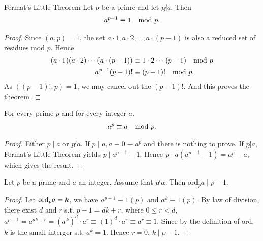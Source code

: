 
\begin{mysubsection}{}
    \begin{theorem}[thm:]{Fermat's Little Theorem}
        Let $p$ be a prime and let $p\not|a$. Then
        \begin{alignat*}{1}
            a^{p-1}\equiv 1\quad \textnormal{mod }p.
        \end{alignat*}
    \end{theorem}

    \begin{proof}
        Since $(a,p)=1$, the set $a\cdot 1,a\cdot 2,\dots,a\cdot (p-1)$ is also a reduced set of residues mod $p$. Hence
        \begin{alignat*}{1}
            (a\cdot 1)(a\cdot 2)\cdots(a\cdot (p-1))&\equiv 1\cdot 2\cdots(p-1)\quad \textnormal{mod }p\\
            a^{p-1}(p-1)!&\equiv (p-1)!\quad \textnormal{mod }p.
        \end{alignat*}
        As $((p-1)!,p)=1$, we may cancel out the $(p-1)!$. And this proves the theorem.
    \end{proof}

    \mynewpage

    \begin{corollary}[crl:]{}
        For every prime $p$ and for every integer $a$,
        \begin{alignat*}{1}
            a^p\equiv a \quad \textnormal{mod }p.
        \end{alignat*}
    \end{corollary}

    \begin{proof}
        Either $p\mid a$ or $p\not| a$. If $p\mid a, a\equiv 0\equiv a^p$ and there is nothing to prove. If $p\not| a$, Fermat's Little Theorem yields $p\mid a^{p-1}-1$. Hence $p\mid a(a^{p-1}-1)=a^{p}-a$, which gives the result.
    \end{proof}

    \begin{corollary}[crl:]{}
        Let $p$ be a prime and $a$ an integer. Assume that $p\not|a$. Then ord$_pa\mid p-1$.
    \end{corollary}

    \begin{proof}
        Let $\textnormal{ord}_pa=k$, we have $a^{p-1}\equiv 1(p)$ and $a^k\equiv 1(p)$. By law of division, there exist $d$ and $r$ s.t. $p-1=dk+r$, where $0\leq r<d$, $a^{p-1}=a^{dk+r}=(a^k)^d\cdot a^r\equiv (1)^d\cdot a^r\equiv a^r\equiv 1$. Since by the definition of ord, $k$ is the small interger s.t. $a^k=1$. Hence $r=0$. $k\mid p-1$.
    \end{proof}
\end{mysubsection}

